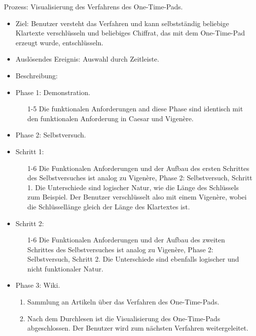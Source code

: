 \documentclass{article}
\begin{document}
\begin{FA}[start=800]
 \item Prozess: Visualisierung des Verfahrens des One-Time-Pads.
\end{FA}
\begin{itemize}[label={}]

 \item Ziel: Benutzer versteht das Verfahren und kann selbstständig beliebige Klartexte verschlüsseln und beliebiges Chiffrat, das mit dem One-Time-Pad erzeugt wurde, entschlüsseln.

 \item Auslösendes Ereignis: Auswahl durch Zeitleiste.

 \item Beschreibung:

 \item Phase 1: Demonstration.

	\begin{enumerate}[]
 	 \item[1-5] Die funktionalen Anforderungen and diese Phase sind identisch mit den 
            funktionalen Anforderung in Caesar und Vigenère.
	\end{enumerate}

 \item Phase 2: Selbstversuch.

 \item Schritt 1:

	\begin{enumerate}
	 \item[1-6] Die Funktionalen Anforderungen und der Aufbau des ersten 
Schrittes des Selbstversuches ist analog zu Vigenère, Phase 2: Selbstversuch, 
Schritt 1. Die Unterschiede sind logischer Natur, wie die Länge des 
Schlüssels zum Beispiel. Der Benutzer verschlüsselt also mit einem 
Vigenère, wobei die Schlüssellänge gleich der Länge des Klartextes ist.
	\end{enumerate}

 \item Schritt 2:

	\begin{enumerate}
	 \item[1-6] Die Funktionalen Anforderungen und der Aufbau des zweiten 
Schrittes des Selbstversuches ist analog zu Vigenère, Phase 2: Selbstversuch, 
Schritt 2. Die Unterschiede sind ebenfalls logischer und nicht funktionaler Natur.
	\end{enumerate}

 \item Phase 3: Wiki.

	\begin{enumerate}
	 \item Sammlung an Artikeln über das Verfahren des One-Time-Pads.
	 \item Nach dem Durchlesen ist die Visualisierung des One-Time-Pads abgeschlossen. Der Benutzer wird zum nächsten Verfahren weitergeleitet.
 	\end{enumerate}

\end{itemize}
\end{document}

